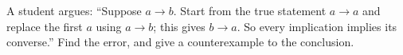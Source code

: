 A student argues: ``Suppose $a\rightarrow b$. Start from the true statement $a\rightarrow a$ and replace the first $a$ using $a\rightarrow b$; this gives $b\rightarrow a$. So every implication implies its converse.'' Find the error, and give a counterexample to the conclusion.
